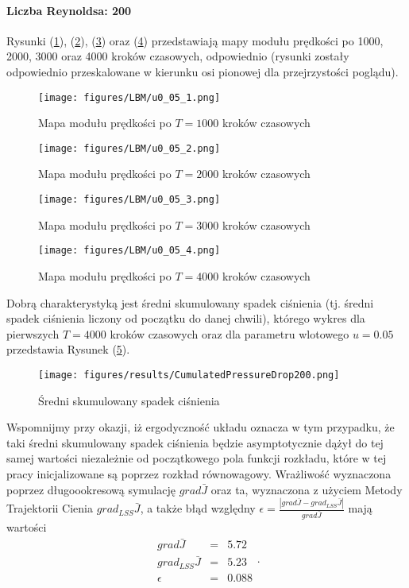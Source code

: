 \documentclass[12pt, twoside]{book}
\begin{document}
\paragraph{Liczba Reynoldsa: 200}
Rysunki (\ref{Fig31}), (\ref{Fig32}), (\ref{Fig33}) oraz (\ref{Fig34}) przedstawiają mapy modułu prędkości po 1000, 2000, 3000 oraz 4000 kroków czasowych, odpowiednio (rysunki zostały odpowiednio przeskalowane w kierunku osi pionowej dla przejrzystości poglądu).
\begin{figure}[H]
	\texttt{[image: figures/LBM/u0\_05\_1.png]} 
	\caption{Mapa modułu prędkości po $ T=1000 $ kroków czasowych}
	\label{Fig31}
\end{figure}
\begin{figure}[H]
	\texttt{[image: figures/LBM/u0\_05\_2.png]} 
	\caption{Mapa modułu prędkości po $ T=2000 $ kroków czasowych}
	\label{Fig32}
\end{figure}
\begin{figure}[H]
	\texttt{[image: figures/LBM/u0\_05\_3.png]} 
	\caption{Mapa modułu prędkości po $ T=3000 $ kroków czasowych}
	\label{Fig33}
\end{figure}
\begin{figure}[H]
	\texttt{[image: figures/LBM/u0\_05\_4.png]} 
	\caption{Mapa modułu prędkości po $ T=4000 $ kroków czasowych}
	\label{Fig34}
\end{figure}
Dobrą charakterystyką jest średni skumulowany spadek ciśnienia (tj. średni spadek ciśnienia liczony od początku do danej chwili), którego wykres dla pierwszych $ T = 4000 $  kroków czasowych oraz dla parametru wlotowego $ u=0.05 $ przedstawia Rysunek (\ref{Fig35}).
\begin{figure}[H]
	\texttt{[image: figures/results/CumulatedPressureDrop200.png]} 
	\centering
	\caption{Średni skumulowany spadek ciśnienia}
	\label{Fig35}
\end{figure}
Wspomnijmy przy okazji, iż ergodyczność układu oznacza w tym przypadku, że taki średni skumulowany spadek ciśnienia będzie asymptotycznie dążył do tej samej wartości niezależnie od początkowego pola funkcji rozkładu, które w tej pracy inicjalizowane są poprzez rozkład równowagowy.\newline
Wrażliwość wyznaczona poprzez długoookresową symulację $ grad\bar{J} $ oraz ta, wyznaczona z użyciem Metody Trajektorii Cienia $ grad_{LSS}\bar{J} $, a także błąd względny $ \epsilon = \frac{|grad\bar{J}-grad_{LSS}\bar{J}|}{grad\bar{J}}$ mają wartości
\begin{equation}
\begin{array}{rcl}
grad\bar{J} &=& 5.72\\
grad_{LSS}\bar{J} &=& 5.23 \\
\epsilon &=& 0.088
\end{array} .
\label{result200}
\end{equation}
\end{document}
